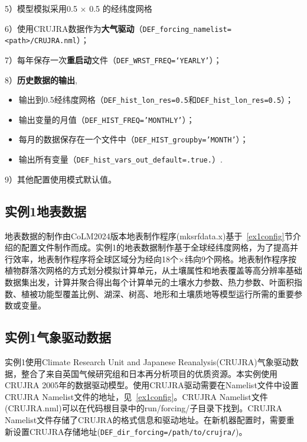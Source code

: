 5）模型模拟采用0.5 \textdegree $\times$ 0.5 \textdegree 的经纬度网格\par

6）使用CRUJRA数据作为\textbf{大气驱动}（\texttt{DEF\_forcing\_namelist=<path>/CRUJRA.nml}）；\par
7）每年保存一次\textbf{重启动}文件（\texttt{DEF\_WRST\_FREQ=‘YEARLY’}）；\par
8）\textbf{历史数据的输出},
\begin{itemize}[nosep,leftmargin=4em]
    \item 输出到0.5\textdegree 经纬度网格（\texttt{DEF\_hist\_lon\_res=0.5}和\texttt{DEF\_hist\_lon\_res=0.5}）；
    \item 输出变量的月值（\texttt{DEF\_HIST\_FREQ='MONTHLY'}）；
    \item 每月的数据保存在一个文件中（\texttt{DEF\_HIST\_groupby='MONTH'}）；
    \item 输出所有变量（\texttt{DEF\_hist\_vars\_out\_default=.true.}）.
\end{itemize}\par
9）其他配置使用模式默认值。

\subsection{实例1地表数据}

地表数据的制作由CoLM2024版本地表制作程序(mksrfdata.x)基于~\ref{ex1config}节介绍的配置文件制作而成。实例1的地表数据制作基于全球经纬度网格，为了提高并行效率，地表制作程序将全球区域分为经向18个$\times$纬向9个网格。地表制作程序按植物群落次网格的方式划分模拟计算单元，从土壤属性和地表覆盖等高分辨率基础数据集出发，计算并聚合得出每个计算单元的土壤水力参数、热力参数、叶面积指数、植被功能型覆盖比例、湖深、树高、地形和土壤质地等模型运行所需的重要参数或变量。

\subsection{实例1气象驱动数据}\label{ex1forcing}

实例1使用Climate Research Unit and Japanese Reanalysis(CRUJRA)气象驱动数据，整合了来自英国气候研究组和日本再分析项目的优质资源。本实例使用CRUJRA 2005年的数据驱动模型。使用CRUJRA驱动需要在Namelist文件中设置CRUJRA Namelist文件的地址，见~\ref{ex1config}。CRUJRA Namelist文件(CRUJRA.nml)可以在代码根目录中的run/forcing/子目录下找到。CRUJRA Namelist文件存储了CRUJRA的格式信息和驱动地址。在新机器配置时，需要重新设置CRUJRA存储地址(\texttt{DEF\_dir\_forcing=/path/to/crujra/})。

